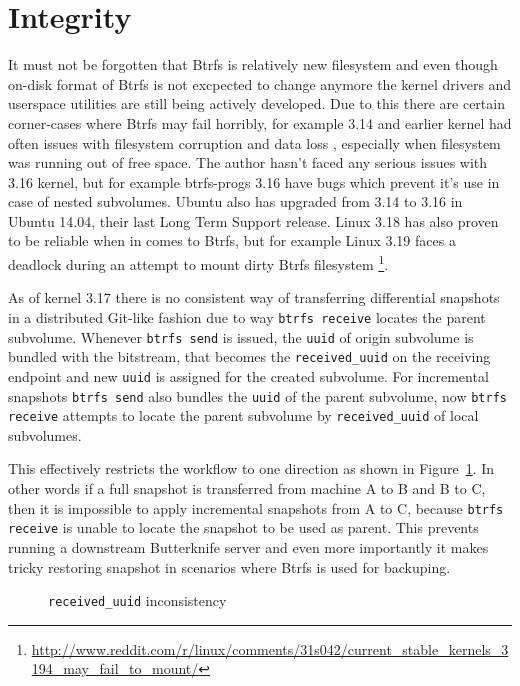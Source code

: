 \documentclass[a4paper,11pt]{kth-mag}
\begin{document}
\section{Integrity}

It must not be forgotten that Btrfs is relatively 
new filesystem and even though on-disk format of
Btrfs is not excpected to change anymore
the kernel drivers and userspace utilities are
still being actively developed.
Due to this there are certain corner-cases where
Btrfs may fail horribly,
for example 3.14 and earlier kernel had often issues
with filesystem corruption and data loss
\cite{btrfs-corruption},
especially when filesystem was running out of free space.
The author hasn't faced any serious issues with
3.16 kernel, but for example btrfs-progs 3.16 have
bugs which prevent it's use in case of nested subvolumes.
Ubuntu also has upgraded from 3.14 to 3.16 in Ubuntu 14.04,
their last Long Term Support release.
Linux 3.18 has also proven to be reliable when in comes
to Btrfs, but for example Linux 3.19 faces
a deadlock during an attempt to mount
dirty Btrfs filesystem
\footnote{\url{http://www.reddit.com/r/linux/comments/31s042/current_stable_kernels_3194_may_fail_to_mount/}}.



As of kernel 3.17 there is no consistent way of transferring
differential snapshots in a distributed Git-like fashion due to way
\texttt{btrfs receive} locates the parent subvolume.
Whenever \texttt{btrfs send} is issued, the \texttt{uuid} of origin
subvolume is bundled with the bitstream, that becomes
the \texttt{received\_uuid} on the receiving endpoint and
new \texttt{uuid} is assigned for the created subvolume.
For incremental snapshots \texttt{btrfs send} also bundles
the \texttt{uuid} of the parent subvolume,
now \texttt{btrfs receive} attempts to locate the parent
subvolume by \texttt{received\_uuid} of local subvolumes.

This effectively restricts the workflow to one direction
as shown in Figure~\ref{fig:btrfs-received-uuid-issue}.
In other words if a full snapshot is transferred
from machine A to B and B to C, then it is impossible
to apply incremental snapshots from A to C, because
\texttt{btrfs receive} is unable to locate the snapshot
to be used as parent.
This prevents running a downstream Butterknife server and
even more importantly it makes tricky restoring snapshot
in scenarios where Btrfs is used for backuping.

\begin{figure}[!htb]
\centering
\scalebox{0.5}{}
\caption{\texttt{received\_uuid} inconsistency}
\label{fig:btrfs-received-uuid-issue}
\end{figure}
\end{document}
